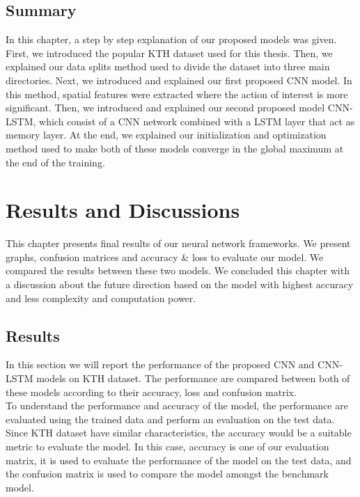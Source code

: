 \section{Summary}
In this chapter, a step by step explanation of our proposed models was given. First, we introduced the popular KTH dataset used for this thesis. Then, we explained our data splits method used to divide the dataset into three main directories. Next, we introduced and explained our first proposed CNN model. In this method, spatial features were extracted where the action of interest is more significant. Then, we introduced and explained our second proposed model CNN-LSTM, which consist of a CNN network combined with a LSTM layer that act as memory layer. At the end, we explained our initialization and optimization method used to make both of these models converge in the global maximum at the end of the training.

\chapter{Results and Discussions}

This chapter presents final results of our neural network frameworks. We present graphs, confusion matrices and accuracy \& loss to evaluate our model. We compared the results between these two models. We concluded this chapter with a discussion about the future direction based on the model with highest accuracy and less complexity and computation power.

\section{Results}
In this section we will report the performance of the proposed CNN and CNN-LSTM models on KTH dataset. The performance are compared between both of these models according to their accuracy, loss and confusion matrix.\\

To understand the performance and accuracy of the model, the performance are evaluated using the trained data and perform an evaluation on the test data. Since KTH dataset have similar characteristics, the accuracy would be a suitable metric to evaluate the model. In this case, accuracy is one of our evaluation matrix, it is used to evaluate the performance of the model on the test data, and the confusion matrix is used to compare the model amongst the benchmark model.\\

